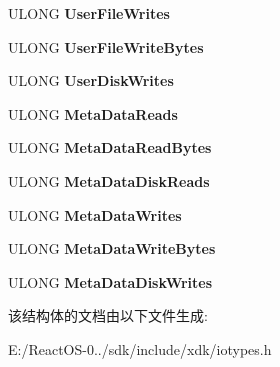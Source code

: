 \begin{DoxyCompactItemize}
U\+L\+O\+NG {\bfseries User\+File\+Writes}
\item 
\mbox{\label{struct___f_i_l_e_s_y_s_t_e_m___s_t_a_t_i_s_t_i_c_s_a527ff39613f9f56390e9ad4701324bcd}} 
U\+L\+O\+NG {\bfseries User\+File\+Write\+Bytes}
\item 
\mbox{\label{struct___f_i_l_e_s_y_s_t_e_m___s_t_a_t_i_s_t_i_c_s_ad8703a13909974304a19a79296691a11}} 
U\+L\+O\+NG {\bfseries User\+Disk\+Writes}
\item 
\mbox{\label{struct___f_i_l_e_s_y_s_t_e_m___s_t_a_t_i_s_t_i_c_s_a2b989d67091f4da404c7fceb7722f1d5}} 
U\+L\+O\+NG {\bfseries Meta\+Data\+Reads}
\item 
\mbox{\label{struct___f_i_l_e_s_y_s_t_e_m___s_t_a_t_i_s_t_i_c_s_ad483226d3a81c3cd7eca52c417b1a4c0}} 
U\+L\+O\+NG {\bfseries Meta\+Data\+Read\+Bytes}
\item 
\mbox{\label{struct___f_i_l_e_s_y_s_t_e_m___s_t_a_t_i_s_t_i_c_s_a6d1d2c9740dec5dc33696385be3b25f6}} 
U\+L\+O\+NG {\bfseries Meta\+Data\+Disk\+Reads}
\item 
\mbox{\label{struct___f_i_l_e_s_y_s_t_e_m___s_t_a_t_i_s_t_i_c_s_a9da1148a3c135acf4891aa787f07f6bc}} 
U\+L\+O\+NG {\bfseries Meta\+Data\+Writes}
\item 
\mbox{\label{struct___f_i_l_e_s_y_s_t_e_m___s_t_a_t_i_s_t_i_c_s_afd315e40e063723e2fae43afddad2412}} 
U\+L\+O\+NG {\bfseries Meta\+Data\+Write\+Bytes}
\item 
\mbox{\label{struct___f_i_l_e_s_y_s_t_e_m___s_t_a_t_i_s_t_i_c_s_a4fe7643247bc585577dd3b13b0a81ff1}} 
U\+L\+O\+NG {\bfseries Meta\+Data\+Disk\+Writes}
\end{DoxyCompactItemize}


该结构体的文档由以下文件生成\+:\begin{DoxyCompactItemize}
\item 
E\+:/\+React\+O\+S-\/0../sdk/include/xdk/iotypes.\+h\end{DoxyCompactItemize}
